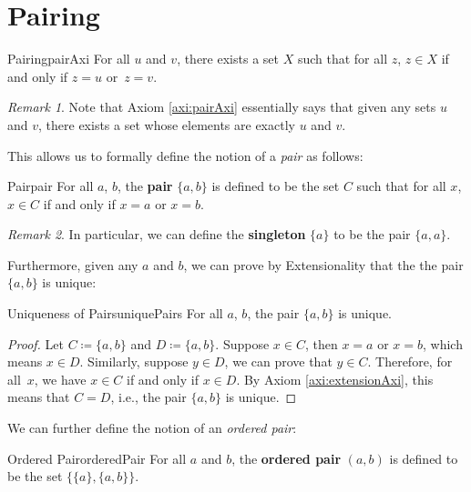 \documentclass[math]{amznotes}
\theoremstyle{remark}
\newtheorem*{remark}{Remark}
\begin{document}
\section{Pairing}
\begin{axibox}{Pairing}{pairAxi}
    For all $u$ and $v$, there exists a set $X$ such that for all $z$, $z \in X$ if and only if $z = u$ or~$z = v$.
\end{axibox}
\begin{notebox}
    \begin{remark}
        Note that Axiom \ref{axi:pairAxi} essentially says that given any sets $u$ and $v$, there exists a set whose elements are exactly $u$ and $v$.
    \end{remark}
\end{notebox}
This allows us to formally define the notion of a \textit{pair} as follows:
\begin{dfnbox}{Pair}{pair}
    For all $a$, $b$, the {\color{red} \textbf{pair}} $\{a, b\}$ is defined to be the set $C$ such that for all $x$, $x \in C$ if and only if $x = a$ or $x = b$.
\end{dfnbox}
\begin{notebox}
    \begin{remark}
        In particular, we can define the {\color{red} \textbf{singleton}} $\{a\}$ to be the pair $\{a, a\}$.
    \end{remark}
\end{notebox}
Furthermore, given any $a$ and $b$, we can prove by Extensionality that the the pair $\{a, b\}$ is unique:
\begin{thmbox}{Uniqueness of Pairs}{uniquePairs}
    For all $a$, $b$, the pair $\{a, b\}$ is unique.
    \tcblower   
    \begin{proof}
        Let $C \coloneqq \{a, b\}$ and $D \coloneqq \{a, b\}$. Suppose $x \in C$, then $x = a$ or $x = b$, which means $x \in D$. Similarly, suppose $y \in D$, we can prove that $y \in C$. Therefore, for all~$x$, we have $x \in C$ if and only if $x \in D$. By Axiom \ref{axi:extensionAxi}, this means that $C = D$, i.e., the pair $\{a, b\}$ is unique.
    \end{proof}
\end{thmbox}
We can further define the notion of an \textit{ordered pair}:
\begin{dfnbox}{Ordered Pair}{orderedPair}
    For all $a$ and $b$, the {\color{red} \textbf{ordered pair}} $(a, b)$ is defined to be the set $\bigl\{\{a\}, \{a, b\}\bigr\}$.
\end{dfnbox}
\end{document}
